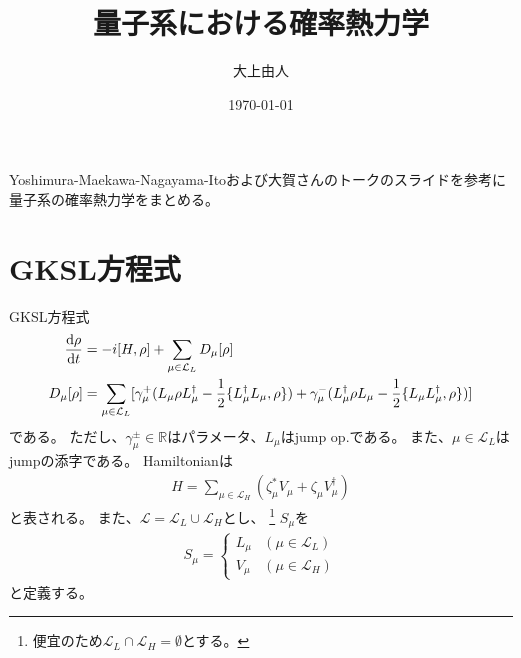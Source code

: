 \documentclass[a4paper,11pt]{jsarticle}
\numberwithin{equation}{section}
\begin{document}
\title{量子系における確率熱力学}
\author{大上由人}
\date{\today}
\maketitle

Yoshimura-Maekawa-Nagayama-Itoおよび大賀さんのトークのスライドを参考に量子系の確率熱力学をまとめる。

\section{GKSL方程式}
GKSL方程式
\begin{align}
    \dv{\rho}{t} &= -i[H,\rho] + \sum_{\mu \in \mathcal{L}_{L}}D_{\mu}[\rho] \\
    D_{\mu}[\rho] &= \sum_{\mu \in \mathcal{L}_{L}} [\gamma_{\mu}^{+} (L_{\mu} \rho L_{\mu}^{\dagger} - \frac{1}{2} \{L_{\mu}^{\dagger} L_{\mu}, \rho\}) 
    + \gamma_{\mu}^{-} (L_{\mu}^{\dagger} \rho L_{\mu} - \frac{1}{2} \{L_{\mu} L_{\mu}^{\dagger}, \rho\})]
\end{align}
である。
ただし、$\gamma_{\mu}^{\pm} \in \mathbb{R}$はパラメータ、$L_{\mu}$はjump op.である。
また、$\mu \in \mathcal{L}_{L}$はjumpの添字である。
Hamiltonianは
\begin{align}
    H = \sum_{\mu \in \mathcal{L}_{H}} (\zeta^*_{\mu} V_{\mu} + \zeta_{\mu} V_{\mu}^{\dagger})
\end{align}
と表される。
また、$\mathcal{L} = \mathcal{L}_{L} \cup \mathcal{L}_{H}$とし、
\footnote{
    便宜のため$\mathcal{L}_{L} \cap \mathcal{L}_{H} = \emptyset$とする。
}
$S_{\mu}$を
\begin{align}
    S_{\mu} =
    \begin{cases}
        L_{\mu} & (\mu \in \mathcal{L}_{L}) \\
        V_{\mu} & (\mu \in \mathcal{L}_{H})
    \end{cases}
\end{align}
と定義する。
\end{document}

